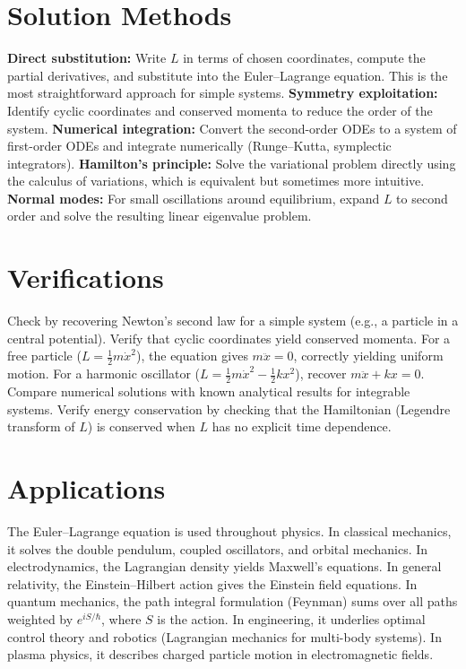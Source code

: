 \documentclass[11pt,openright]{book}
\begin{document}
\section*{Solution Methods}

\textbf{Direct substitution:} Write $L$ in terms of chosen coordinates, compute the partial derivatives, and substitute into the Euler--Lagrange equation. This is the most straightforward approach for simple systems. \textbf{Symmetry exploitation:} Identify cyclic coordinates and conserved momenta to reduce the order of the system. \textbf{Numerical integration:} Convert the second-order ODEs to a system of first-order ODEs and integrate numerically (Runge--Kutta, symplectic integrators). \textbf{Hamilton's principle:} Solve the variational problem directly using the calculus of variations, which is equivalent but sometimes more intuitive. \textbf{Normal modes:} For small oscillations around equilibrium, expand $L$ to second order and solve the resulting linear eigenvalue problem.
\section*{Verifications}

Check by recovering Newton's second law for a simple system (e.g., a particle in a central potential). Verify that cyclic coordinates yield conserved momenta. For a free particle ($L = \frac{1}{2}m\dot{x}^2$), the equation gives $m\ddot{x} = 0$, correctly yielding uniform motion. For a harmonic oscillator ($L = \frac{1}{2}m\dot{x}^2 - \frac{1}{2}kx^2$), recover $m\ddot{x} + kx = 0$. Compare numerical solutions with known analytical results for integrable systems. Verify energy conservation by checking that the Hamiltonian (Legendre transform of $L$) is conserved when $L$ has no explicit time dependence.
\section*{Applications}

The Euler--Lagrange equation is used throughout physics. In classical mechanics, it solves the double pendulum, coupled oscillators, and orbital mechanics. In electrodynamics, the Lagrangian density yields Maxwell's equations. In general relativity, the Einstein--Hilbert action gives the Einstein field equations. In quantum mechanics, the path integral formulation (Feynman) sums over all paths weighted by $e^{iS/\hbar}$, where $S$ is the action. In engineering, it underlies optimal control theory and robotics (Lagrangian mechanics for multi-body systems). In plasma physics, it describes charged particle motion in electromagnetic fields.
\end{document}
